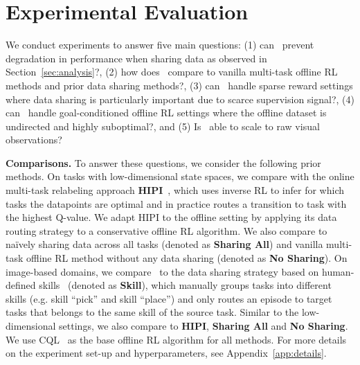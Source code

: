 \section{Experimental Evaluation}
\label{sec:exp}

We conduct experiments to answer five main questions: (1) can \methodname\ prevent degradation in performance when sharing data as observed in Section~\ref{sec:analysis}?, (2) how does \methodname\ compare to vanilla multi-task offline RL methods and prior data sharing methods?,
(3) can \methodname\ handle sparse reward settings where data sharing is particularly important due to scarce supervision signal?, (4) can \methodname\ handle goal-conditioned offline RL settings where the offline dataset is undirected and highly suboptimal?, and (5) Is \methodname\ able to scale to raw visual observations?

\textbf{Comparisons.} To answer these questions, we consider the following prior methods. On tasks with low-dimensional state spaces, we compare with the online multi-task relabeling approach \textbf{HIPI}~\citep{eysenbach2020rewriting}, which uses inverse RL to infer for which tasks the datapoints are optimal and in practice routes a transition to task with the highest Q-value. We adapt HIPI to the offline setting by applying its data routing strategy to a conservative offline RL algorithm.
We also compare to na\"ively sharing data across all tasks (denoted as \textbf{Sharing All}) and vanilla multi-task offline RL method without any data sharing (denoted as \textbf{No Sharing}). On image-based domains, we compare \methodname\ to the data sharing strategy based on human-defined skills~\citep{kalashnikov2021mt} (denoted as \textbf{Skill}), which manually groups tasks into different skills (e.g. skill ``pick'' and skill ``place'') and only routes an episode to target tasks that belongs to the same skill of the source task.
Similar to the low-dimensional settings, we also compare to \textbf{HIPI}, \textbf{Sharing All} and \textbf{No Sharing}. We use CQL~\citep{kumar2020conservative} as the base offline RL algorithm for all methods. For more details on the experiment set-up and hyperparameters, see Appendix~\ref{app:details}.


